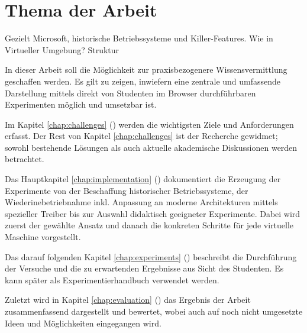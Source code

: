		

\section{Thema der Arbeit}
\label{sec:topic}
				
		
		Gezielt Microsoft, historische Betriebssysteme und Killer-Features. 
		Wie in Virtueller Umgebung?
		Struktur


		In dieser Arbeit soll die Möglichkeit zur praxisbezogenere Wissensvermittlung geschaffen werden. Es gilt zu zeigen, inwiefern eine zentrale und umfassende Darstellung mittels direkt von Studenten im Browser durchführbaren Experimenten möglich und umsetzbar ist.
		
		Im Kapitel \ref{chap:challenges} () werden die wichtigsten Ziele und Anforderungen erfasst. 
		Der Rest von Kapitel \ref{chap:challenges} ist der Recherche gewidmet; sowohl bestehende Lösungen als auch aktuelle akademische Diskussionen werden betrachtet.
		
		Das Hauptkapitel \ref{chap:implementation} () dokumentiert die Erzeugung der Experimente von der Beschaffung historischer Betriebssysteme, der Wiederinebetriebnahme inkl. Anpassung an moderne Architekturen mittels spezieller Treiber bis zur Auswahl didaktisch geeigneter Experimente.
		Dabei wird zuerst der gewählte Ansatz und danach die konkreten Schritte für jede virtuelle Maschine vorgestellt.
		
		Das darauf folgenden Kapitel \ref{chap:experiments} () beschreibt die Durchführung der Versuche und die zu erwartenden Ergebnisse aus Sicht des Studenten. Es kann später als Experimentierhandbuch verwendet werden.

		Zuletzt wird in Kapitel \ref{chap:evaluation} () das Ergebnis der Arbeit zusammenfassend dargestellt und bewertet, wobei auch auf noch nicht umgesetzte Ideen und Möglichkeiten eingegangen wird.
		

